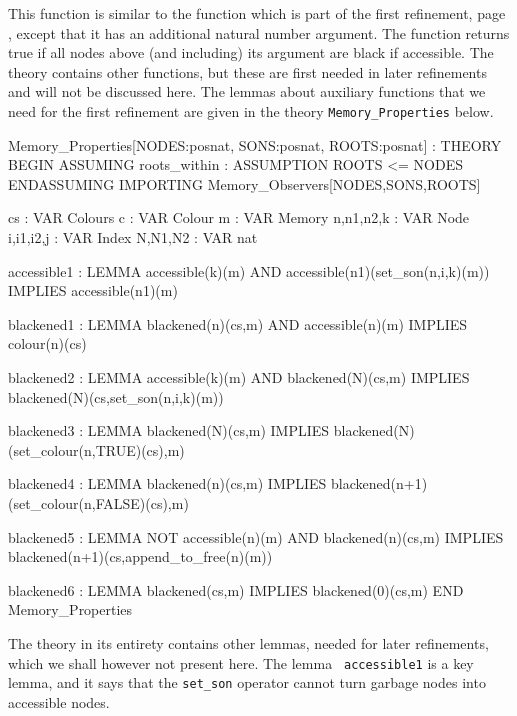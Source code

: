 This function is  similar to the function  which is part  of the first
refinement, page \pageref{pvs-coloured-memory}, except  that it has an
additional natural number argument.   The function returns true if all
nodes above (and including) its argument are black if accessible.  The
theory contains other  functions, but these  are first needed in later
refinements and  will  not  be  discussed   here.  The   lemmas  about
auxiliary functions that we need for the first refinement are given in
the theory {\tt Memory\_Properties} below.

\begin{smallsession}
Memory_Properties[NODES:posnat, SONS:posnat, ROOTS:posnat] : THEORY
BEGIN
  ASSUMING
    roots_within : ASSUMPTION ROOTS <= NODES
  ENDASSUMING
  IMPORTING Memory_Observers[NODES,SONS,ROOTS]

  cs        : VAR Colours
  c         : VAR Colour
  m         : VAR Memory
  n,n1,n2,k : VAR Node
  i,i1,i2,j : VAR Index
  N,N1,N2   : VAR nat

  accessible1 : LEMMA 
    accessible(k)(m) AND accessible(n1)(set_son(n,i,k)(m))
      IMPLIES accessible(n1)(m)

  blackened1 : LEMMA 
    blackened(n)(cs,m) AND accessible(n)(m) IMPLIES colour(n)(cs)

  blackened2 : LEMMA
    accessible(k)(m) AND blackened(N)(cs,m) 
      IMPLIES blackened(N)(cs,set_son(n,i,k)(m))

  blackened3 : LEMMA
    blackened(N)(cs,m) IMPLIES blackened(N)(set_colour(n,TRUE)(cs),m)

  blackened4 : LEMMA
    blackened(n)(cs,m) IMPLIES blackened(n+1)(set_colour(n,FALSE)(cs),m)

  blackened5 : LEMMA
    NOT accessible(n)(m) AND blackened(n)(cs,m)
      IMPLIES blackened(n+1)(cs,append_to_free(n)(m))

  blackened6 : LEMMA
    blackened(cs,m) IMPLIES blackened(0)(cs,m)
END Memory_Properties
\end{smallsession}
\label{function-lemmas-refinement1}

The  theory  in its entirety contains   other lemmas, needed for later
refinements, which we shall however not present  here.  The lemma {\tt
  accessible1} is a key lemma,  and it says   that the {\tt  set\_son}
operator cannot turn garbage nodes into accessible nodes.


